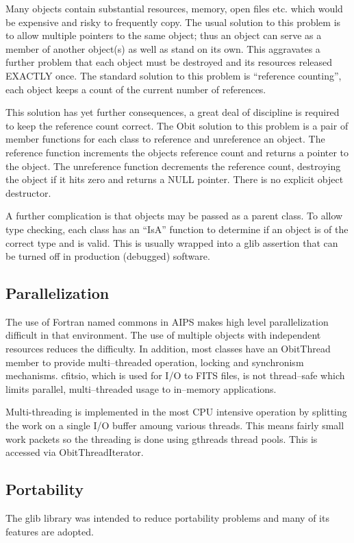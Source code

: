 \documentclass[11pt]{article}
\begin{document}
   Many objects contain substantial resources, memory, open files etc.
which would be expensive and risky to frequently copy.
The usual solution to this problem is to allow multiple pointers to
the same object; thus an object can serve as a member of another
object(s) as well as stand on its own.
This aggravates a further problem that each object must be destroyed
and its resources released EXACTLY once.
The standard solution to this problem is ``reference counting'', each
object keeps a count of the current number of references.

   This solution has yet further consequences, a great deal of
discipline is required to keep the reference count correct.
The Obit solution to this problem is a pair of member functions for
each class to reference and unreference an object.
The reference function increments the objects reference count and
returns a pointer to the object.
The unreference function decrements the reference count, destroying
the object if it hits zero and returns a NULL pointer.
There is no explicit object destructor.

A further complication is that objects may be passed as a parent
class.  
To allow type checking, each class has an ``IsA'' function to
determine if an object is of the correct type and is valid.
This is usually wrapped into a glib assertion that can be turned off
in production (debugged) software.

\subsection{Parallelization}
The use of Fortran named commons in AIPS makes high level
parallelization difficult in that environment.
The use of multiple objects with independent resources reduces the
difficulty.
In addition, most classes have an ObitThread member to provide
multi--threaded operation, locking and synchronism mechanisms.
cfitsio, which is used for I/O to FITS files, is not thread--safe
which limits parallel, multi--threaded usage to in--memory
applications.

Multi-threading is implemented in the most CPU intensive operation by
splitting the work on a single I/O buffer amoung various threads.
This means fairly small work packets so the threading is done using 
gthreads thread pools.
This is accessed via ObitThreadIterator.

\subsection{Portability}
The glib library was intended to reduce portability problems and many
of its features are adopted.
\end{document}
